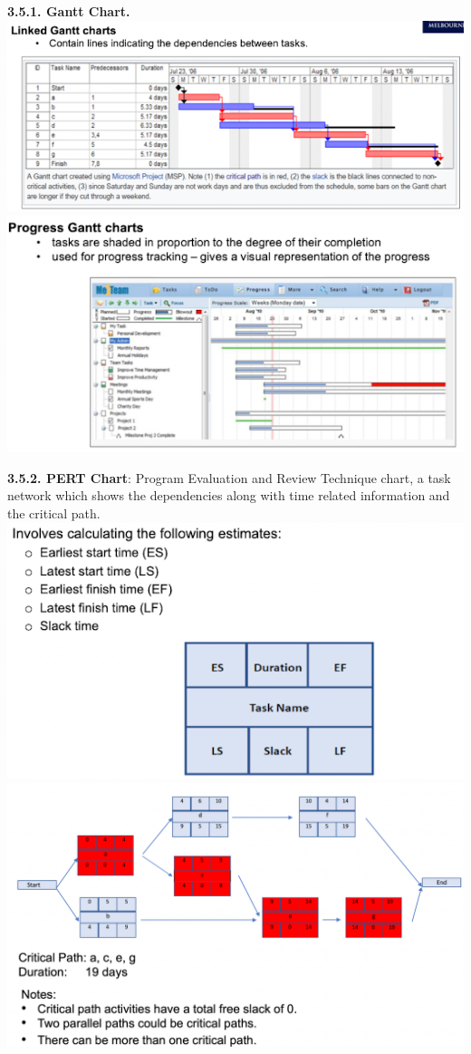         \textbf{3.5.1. Gantt Chart.}
        \includegraphics[width=\linewidth]{figs/SCR-20240606-pfel.png}
        \includegraphics[width=\linewidth]{figs/SCR-20240606-pffv.png}

        \textbf{3.5.2. PERT Chart}: Program Evaluation and Review Technique chart, a task network which shows the dependencies along with time related information and the critical path.
        \includegraphics[width=\linewidth]{figs/SCR-20240606-pfyr.png}
        \includegraphics[width=\linewidth]{figs/SCR-20240606-pggc.png}

